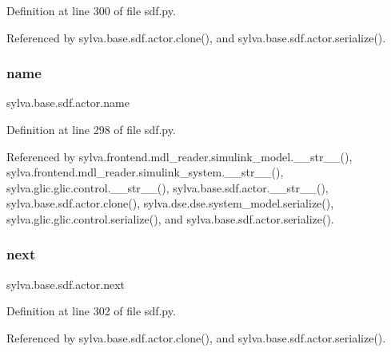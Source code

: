 Definition at line 300 of file sdf.\+py.



Referenced by sylva.\+base.\+sdf.\+actor.\+clone(), and sylva.\+base.\+sdf.\+actor.\+serialize().

\mbox{\label{classsylva_1_1base_1_1sdf_1_1actor_a2ef1df32bd9d891a43df5b59cdc2f33b}} 
\subsubsection{\texorpdfstring{name}{name}}
{\footnotesize\ttfamily sylva.\+base.\+sdf.\+actor.\+name}



Definition at line 298 of file sdf.\+py.



Referenced by sylva.\+frontend.\+mdl\+\_\+reader.\+simulink\+\_\+model.\+\_\+\+\_\+str\+\_\+\+\_\+(), sylva.\+frontend.\+mdl\+\_\+reader.\+simulink\+\_\+system.\+\_\+\+\_\+str\+\_\+\+\_\+(), sylva.\+glic.\+glic.\+control.\+\_\+\+\_\+str\+\_\+\+\_\+(), sylva.\+base.\+sdf.\+actor.\+\_\+\+\_\+str\+\_\+\+\_\+(), sylva.\+base.\+sdf.\+actor.\+clone(), sylva.\+dse.\+dse.\+system\+\_\+model.\+serialize(), sylva.\+glic.\+glic.\+control.\+serialize(), and sylva.\+base.\+sdf.\+actor.\+serialize().

\mbox{\label{classsylva_1_1base_1_1sdf_1_1actor_aa182473926fcf5c58d284b5f23351629}} 
\subsubsection{\texorpdfstring{next}{next}}
{\footnotesize\ttfamily sylva.\+base.\+sdf.\+actor.\+next}



Definition at line 302 of file sdf.\+py.



Referenced by sylva.\+base.\+sdf.\+actor.\+clone(), and sylva.\+base.\+sdf.\+actor.\+serialize().

\mbox{\label{classsylva_1_1base_1_1sdf_1_1actor_aa145dfb1abe65febe991235fb715f44e}} 
